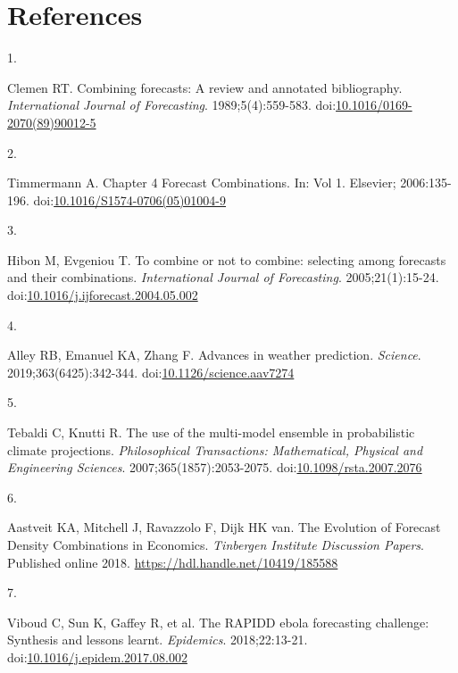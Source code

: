 \documentclass[
  letterpaper,
  DIV=11,
  numbers=noendperiod]{scrartcl}
\newlength{\cslhangindent}
\newlength{\csllabelwidth}
\newenvironment{CSLReferences}[2] %
 {\begin{list}{}{%
  \setlength{\itemindent}{0pt}
  \setlength{\leftmargin}{0pt}
  \setlength{\parsep}{0pt}
  \ifodd #1
   \setlength{\leftmargin}{\cslhangindent}
   \setlength{\itemindent}{-1\cslhangindent}
  \fi
  \setlength{\itemsep}{#2\baselineskip}}}
 {\end{list}}
\newcommand{\CSLLeftMargin}[1]{\parbox[t]{\csllabelwidth}{\strut#1\strut}}
\newcommand{\CSLRightInline}[1]{\parbox[t]{\linewidth - \csllabelwidth}{\strut#1\strut}}
\begin{document}
\section*{References}\label{references}

\label{refs}
\begin{CSLReferences}{0}{1}
\CSLLeftMargin{1. }%
\CSLRightInline{Clemen RT. Combining forecasts: A review and annotated
bibliography. \emph{International Journal of Forecasting}.
1989;5(4):559-583.
doi:\href{https://doi.org/10.1016/0169-2070(89)90012-5}{10.1016/0169-2070(89)90012-5}}

\CSLLeftMargin{2. }%
\CSLRightInline{Timmermann A. Chapter 4 Forecast Combinations. In: Vol
1. Elsevier; 2006:135-196.
doi:\href{https://doi.org/10.1016/S1574-0706(05)01004-9}{10.1016/S1574-0706(05)01004-9}}

\CSLLeftMargin{3. }%
\CSLRightInline{Hibon M, Evgeniou T. To combine or not to combine:
selecting among forecasts and their combinations. \emph{International
Journal of Forecasting}. 2005;21(1):15-24.
doi:\href{https://doi.org/10.1016/j.ijforecast.2004.05.002}{10.1016/j.ijforecast.2004.05.002}}

\CSLLeftMargin{4. }%
\CSLRightInline{Alley RB, Emanuel KA, Zhang F. Advances in weather
prediction. \emph{Science}. 2019;363(6425):342-344.
doi:\href{https://doi.org/10.1126/science.aav7274}{10.1126/science.aav7274}}

\CSLLeftMargin{5. }%
\CSLRightInline{Tebaldi C, Knutti R. The use of the multi-model ensemble
in probabilistic climate projections. \emph{Philosophical Transactions:
Mathematical, Physical and Engineering Sciences}.
2007;365(1857):2053-2075.
doi:\href{https://doi.org/10.1098/rsta.2007.2076}{10.1098/rsta.2007.2076}}

\CSLLeftMargin{6. }%
\CSLRightInline{Aastveit KA, Mitchell J, Ravazzolo F, Dijk HK van. The
Evolution of Forecast Density Combinations in Economics. \emph{Tinbergen
Institute Discussion Papers}. Published online 2018.
\url{https://hdl.handle.net/10419/185588}}

\CSLLeftMargin{7. }%
\CSLRightInline{Viboud C, Sun K, Gaffey R, et al. The RAPIDD ebola
forecasting challenge: Synthesis and lessons learnt. \emph{Epidemics}.
2018;22:13-21.
doi:\href{https://doi.org/10.1016/j.epidem.2017.08.002}{10.1016/j.epidem.2017.08.002}}


\end{CSLReferences}
\end{document}
